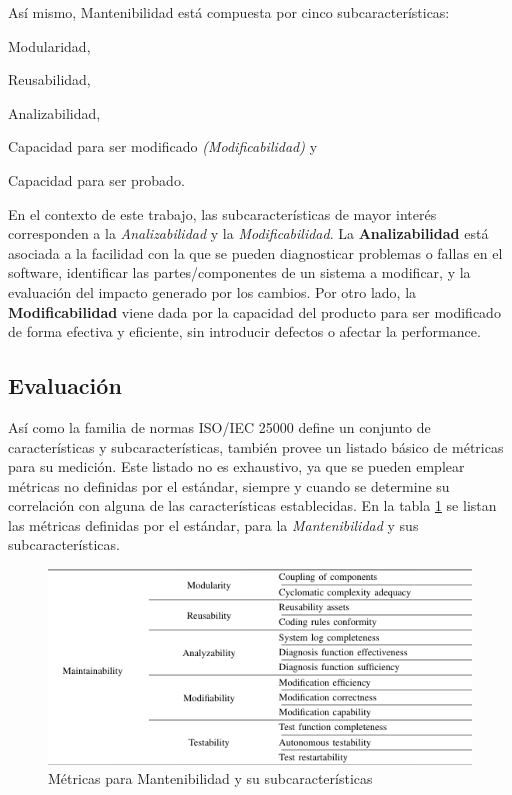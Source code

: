 Así mismo, Mantenibilidad está compuesta por cinco subcaracterísticas:
\begin{inparaenum}[(a)]
    \item Modularidad,
    \item Reusabilidad,
    \item Analizabilidad,
    \item Capacidad para ser modificado \textit{(Modificabilidad)} y
    \item Capacidad para ser probado.
\end{inparaenum}
En el contexto de este trabajo, las subcaracterísticas de mayor interés corresponden
a la \textit{Analizabilidad} y la \textit{Modificabilidad}.
La \textbf{Analizabilidad} está asociada a la facilidad con la que se pueden diagnosticar problemas
o fallas en el software, identificar las partes/componentes de un sistema a modificar, y la
evaluación del impacto generado por los cambios.
Por otro lado, la \textbf{Modificabilidad} viene dada por la capacidad del producto para ser
modificado de forma efectiva y eficiente, sin introducir defectos o afectar la performance.

\subsection{Evaluación}

Así como la familia de normas ISO/IEC 25000 define un conjunto de características y
subcaracterísticas, también provee un listado básico de métricas para su medición.
Este listado no es exhaustivo, ya que se pueden emplear métricas no definidas por el
estándar, siempre y cuando se determine su correlación con alguna de las características
establecidas.
En la tabla \ref{Metrics} se listan las métricas definidas por el estándar, para la \textit{Mantenibilidad}
y sus subcaracterísticas.

\begin{figure}
    \label{Metrics}
    \includegraphics[width=12cm]{quality_metrics/quality_metrics.png}
    \centering
    \caption{Métricas para Mantenibilidad y su subcaracterísticas}
\end{figure}

